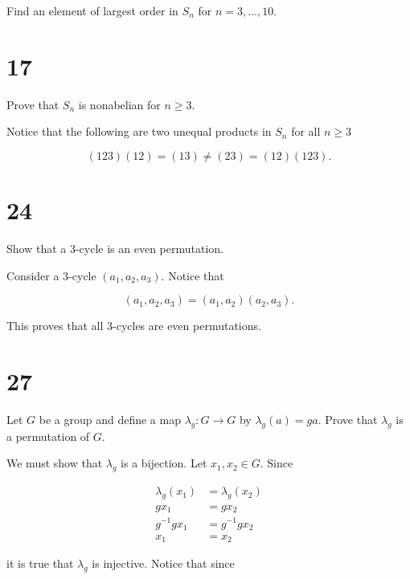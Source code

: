 \documentclass[a4paper]{article}
\begin{document}
Find an element of largest order in $S_n$ for $n = 3, ... , 10.$

\vspace{\baselineskip}




\section*{17}

Prove that $S_n$ is nonabelian for $n \geq 3$.

\vspace{\baselineskip}

Notice that the following are two unequal products in $S_n$ for all $n \geq 3$ 

$$(123)(12) = (13) \neq (23) = (12)(123).$$



\section*{24}

Show that a 3-cycle is an even permutation.

\vspace{\baselineskip}

Consider a 3-cycle $(a_1, a_2, a_3)$. Notice that 

$$(a_1, a_2, a_3) = (a_1, a_2)(a_2, a_3).$$

This proves that all 3-cycles are even permutations.


\section*{27}

Let $G$ be a group and define a map $\lambda_g : G \rightarrow G$ by $\lambda_g(a) = ga$. Prove that $\lambda_g$ is a permutation of $G$.

\vspace{\baselineskip}

We must show that $\lambda_g$ is a bijection. Let $x_1, x_2 \in G$. Since

\begin{align*}
\lambda_g(x_1) &= \lambda_g(x_2) \\
gx_1 &= gx_2 \\
g^{-1} g x_1 &= g^{-1} g x_2 \\
x_1 &= x_2
\end{align*}

it is true that $\lambda_g$ is injective. Notice that since
\end{document}

